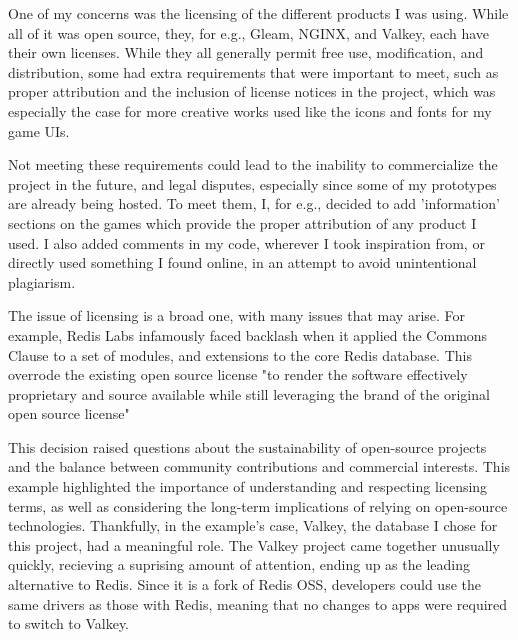 \documentclass[]{final}
\begin{document}

One of my concerns was the licensing of the different products I was using.
While all of it was open source, they, for e.g., Gleam, NGINX, and Valkey,
each have their own licenses.
While they all generally permit free use, modification, and distribution,
some had extra requirements that were important to meet,
such as proper attribution and the inclusion of license notices in
the project, which was especially the case for more creative works used
like the icons and fonts for my game UIs.

Not meeting these requirements
could lead to the inability to commercialize the project
in the future, and legal disputes, especially since some of my prototypes are
already being hosted. To meet them, I, for e.g., decided to add 'information' sections on
the games which provide the proper attribution of any product I used. I
also added comments in my code, wherever I took inspiration from, or directly
used something I found online, in an attempt to avoid unintentional plagiarism.


The issue of licensing is a broad one, with many issues that may arise.
For example, Redis Labs infamously faced backlash when it applied
the Commons Clause to a set of modules, and extensions to the core Redis database.
This overrode the existing open source license "to render the
software effectively proprietary and source available while still leveraging
the brand of the original open source license"


This decision raised questions about the sustainability of open-source projects
and the balance between community contributions and commercial interests.
This example highlighted the importance of understanding
and respecting licensing terms, as well as considering the long-term
implications of relying on open-source technologies. Thankfully, in the example's
case, Valkey, the database I chose for this project, had a meaningful role.
The Valkey project came together unusually quickly, recieving a suprising amount
of attention, ending up as the leading alternative to Redis. Since it is a fork
of Redis OSS, developers could use the same drivers as those with Redis, meaning
that no changes to apps were required to switch to Valkey.
\end{document}
